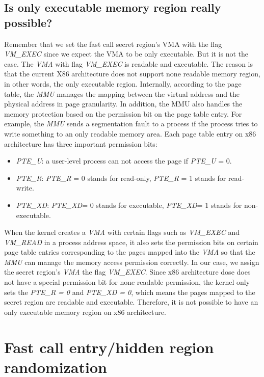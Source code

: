 \subsection{Is only executable memory region really possible?}

Remember that we set the fast call secret region's VMA with the flag \emph{VM\_EXEC} 
since we expect the VMA  to be only executable. But it is not the case. The \emph{VMA} 
with flag \emph{VM\_EXEC} is readable and executable. The reason is that the current X86 architecture does not support none readable memory region, in other words, the only executable region.  
Internally, according to the page table, the \emph{MMU} manages the mapping between the virtual address and the physical address in page granularity. In addition, the MMU also handles the memory 
protection based on the permission bit on the page table entry. For example, the \emph{MMU} sends a segmentation fault to a process if the process tries to write something to an only readable memory area. 
Each page table entry on x86 architecture has three important permission bits:

\begin{itemize}
  \item \emph{PTE\_U}:  a user-level process can not access the page if \emph{PTE\_U} = 0. 
  \item \emph{PTE\_R}:  \emph{PTE\_R} = 0 stands  for read-only, \emph{PTE\_R} = 1 stands for read-write.
  \item \emph{PTE\_XD}: \emph{PTE\_XD}= 0 stands for executable, \emph{PTE\_XD}= 1 stands for non-executable.
\end{itemize}

When the kernel creates a \emph{VMA} with certain flags such as \emph{VM\_EXEC} and \emph{VM\_READ} in a process address space,  it also sets the permission bits on certain page 
table entries corresponding to the pages mapped into the \emph{VMA} so that the \emph{MMU} can manage the memory access permission correctly. In our case, we assign the secret region's \emph{VMA} the flag 
\emph{VM\_EXEC}. Since x86 architecture dose does not have a special permission bit for none readable permission, the kernel only sets the \emph{PTE\_R = 0} and \emph{PTE\_XD = 0}, which means the pages mapped to the secret region are readable and executable.  
Therefore, it is not possible to have an only executable memory region on x86 architecture.


\section{Fast call entry/hidden region randomization}


